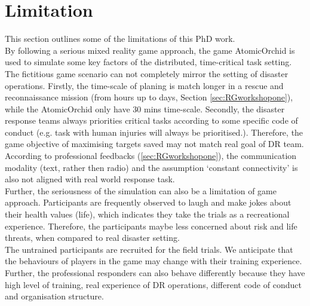 
\section{Limitation}
This section outlines some of the limitations of this PhD work. \\

By following a serious mixed reality game approach, the game AtomicOrchid is used to simulate some key factors of the distributed, time-critical task setting.  The fictitious game scenario can not completely mirror the setting of disaster operations. Firstly, the time-scale of planing is match longer in a rescue and reconnaissance mission (from hours up to days, Section \ref{sec:RGworkshopone}), while the AtomicOrchid only have 30 mins time-scale. Secondly, the disaster response teams always priorities critical tasks according to some specific code of conduct (e.g. task with human injuries will always be prioritised.). Therefore, the game objective of maximising targets saved may not match real goal of DR team. According to professional feedbacks (\ref{sec:RGworkshopone}), the communication modality (text, rather then radio) and the assumption `constant connectivity' is also not aligned with real world response task. \\

Further, the seriousness of the simulation can also be a limitation of game approach. Participants are frequently observed to laugh and make jokes about their health values (life), which indicates they take the trials as a recreational experience. Therefore, the participants maybe less concerned about risk and life threats, when compared to real disaster setting. \\

The untrained participants are recruited for the field trials. We anticipate that the behaviours of players in the game may change with their training experience. Further, the professional responders can also behave differently because they have high level of training, real experience of DR operations, different code of conduct and organisation structure.\\

